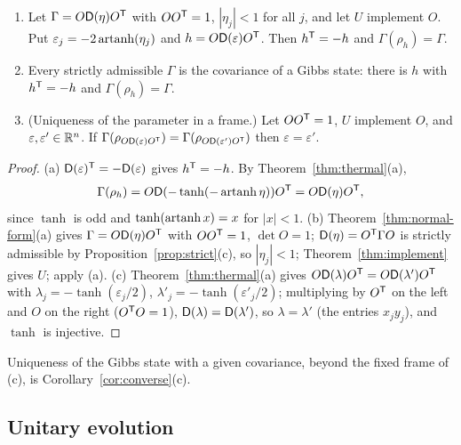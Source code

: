 \begin{theorem}\label{thm:exp-realization}
\begin{enumerate}
\item[(a)] Let $\Gamma=O\mathsf D(\eta)O^{\mathsf T}$ with $OO^{\mathsf T}=1$, $|\eta_j|<1$ for all $j$, and let $U$
implement $O$. Put $\varepsilon_j=-2\operatorname{artanh}(\eta_j)$ and $h=O\mathsf D(\varepsilon)O^{\mathsf T}$. Then
$h^{\mathsf T}=-h$ and $\Gamma(\rho_h)=\Gamma$.
\item[(b)] Every strictly admissible $\Gamma$ is the covariance of a Gibbs state:
there is $h$ with $h^{\mathsf T}=-h$ and $\Gamma(\rho_h)=\Gamma$.
\item[(c)] (Uniqueness of the parameter in a frame.) Let $OO^{\mathsf T}=1$, $U$ implement $O$, and
$\varepsilon,\varepsilon'\in\mathbb R^n$. If
$\Gamma(\rho_{O\mathsf D(\varepsilon)O^{\mathsf T}})=\Gamma(\rho_{O\mathsf D(\varepsilon')O^{\mathsf T}})$ then
$\varepsilon=\varepsilon'$.
\end{enumerate}
\end{theorem}
\begin{proof}
(a) $\mathsf D(\varepsilon)^{\mathsf T}=-\mathsf D(\varepsilon)$ gives $h^{\mathsf T}=-h$. By Theorem~\ref{thm:thermal}(a),
\[
 \Gamma(\rho_h)=O\mathsf D(-\tanh(-\operatorname{artanh}\eta))O^{\mathsf T}=O\mathsf D(\eta)O^{\mathsf T},
\]
since $\tanh$ is odd and $\tanh(\operatorname{artanh} x)=x$ for $|x|<1$. (b) Theorem~\ref{thm:normal-form}(a) gives
$\Gamma=O\mathsf D(\eta)O^{\mathsf T}$ with $OO^{\mathsf T}=1$, $\det O=1$; $\mathsf D(\eta)=O^{\mathsf T}\Gamma O$ is strictly
admissible by Proposition~\ref{prop:strict}(c), so $|\eta_j|<1$; Theorem~\ref{thm:implement}
gives $U$; apply (a). (c) Theorem~\ref{thm:thermal}(a) gives
$O\mathsf D(\lambda)O^{\mathsf T}=O\mathsf D(\lambda')O^{\mathsf T}$ with $\lambda_j=-\tanh(\varepsilon_j/2)$,
$\lambda'_j=-\tanh(\varepsilon'_j/2)$; multiplying by $O^{\mathsf T}$ on the left and $O$ on the right
($O^{\mathsf T}O=1$), $\mathsf D(\lambda)=\mathsf D(\lambda')$, so $\lambda=\lambda'$ (the entries $x_jy_j$), and
$\tanh$ is injective.
\end{proof}
Uniqueness of the Gibbs state with a given covariance, beyond the fixed frame of (c), is
Corollary~\ref{cor:converse}(c).

\subsection{Unitary evolution}
\label{sec:evolution}


